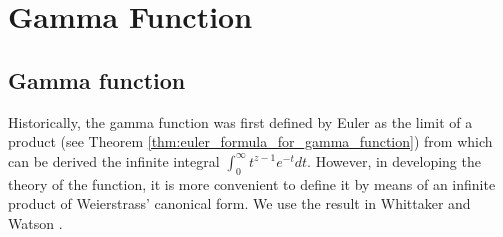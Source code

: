 















\section{Gamma Function}

\subsection{Gamma function}

Historically, the gamma function was first defined by Euler as the limit of a product (see Theorem \ref{thm:euler_formula_for_gamma_function}) from which can be derived the infinite integral $\int^\infty_0 t^{z-1}e^{-t} dt$. However, in developing the theory of the function, it is more convenient to define it by means of an infinite product of Weierstrass' canonical form. We use the result in Whittaker and Watson \cite{Whittaker_Watson_1963}.

